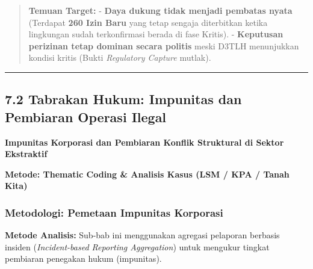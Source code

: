 \documentclass[
]{article}
\begin{document}
\begin{quote}
\textbf{Temuan Target:} - \textbf{Daya dukung tidak menjadi pembatas
nyata} (Terdapat \textbf{260 Izin Baru} yang tetap sengaja diterbitkan
ketika lingkungan sudah terkonfirmasi berada di fase Kritis). -
\textbf{Keputusan perizinan tetap dominan secara politis} meski D3TLH
menunjukkan kondisi kritis (Bukti \emph{Regulatory Capture} mutlak).
\end{quote}

\begin{center}\rule{0.5\linewidth}{0.5pt}\end{center}

\subsection{7.2 Tabrakan Hukum: Impunitas dan Pembiaran Operasi
Ilegal}\label{tabrakan-hukum-impunitas-dan-pembiaran-operasi-ilegal}

\textbf{Impunitas Korporasi dan Pembiaran Konflik Struktural di Sektor
Ekstraktif}

\textbf{Metode: Thematic Coding \& Analisis Kasus (LSM / KPA / Tanah
Kita)}

\subsubsection{Metodologi: Pemetaan Impunitas
Korporasi}\label{metodologi-pemetaan-impunitas-korporasi}

\textbf{Metode Analisis:} Sub-bab ini menggunakan agregasi pelaporan
berbasis insiden (\emph{Incident-based Reporting Aggregation}) untuk
mengukur tingkat pembiaran penegakan hukum (impunitas).
\end{document}
